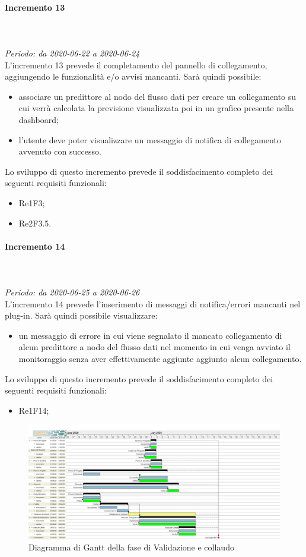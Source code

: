 \paragraph{Incremento 13}\mbox{} \\ \mbox{} \\ 
\textit{Periodo: da 2020-06-22 a 2020-06-24} \\
L'incremento 13 prevede il completamento del pannello di collegamento, aggiungendo le funzionalità e/o avvisi mancanti. Sarà quindi possibile: \begin{itemize}
\item associare un predittore al nodo del flusso dati per creare un collegamento su cui verrà calcolata la previsione visualizzata poi in un grafico presente nella dashboard;
\item l’utente deve poter visualizzare un messaggio di notifica di collegamento avvenuto con successo.
\end{itemize}
Lo sviluppo di questo incremento prevede il soddisfacimento completo dei seguenti requisiti funzionali: \begin{itemize}
\item Re1F3;
\item Re2F3.5.
\end{itemize}

\paragraph{Incremento 14}\mbox{} \\ \mbox{} \\ 
\textit{Periodo: da 2020-06-25 a 2020-06-26}\\
L'incremento 14 prevede l'inserimento di messaggi di notifica/errori mancanti nel plug-in. Sarà quindi possibile visualizzare: \begin{itemize}
\item un messaggio di errore in cui viene segnalato il mancato collegamento
di alcun predittore a nodo del flusso dati nel momento in cui venga
avviato il monitoraggio senza aver effettivamente aggiunte aggiunto
alcun collegamento.
\end{itemize}
Lo sviluppo di questo incremento prevede il soddisfacimento completo dei seguenti requisiti funzionali: \begin{itemize}
\item Re1F14;
\end{itemize}

\begin{figure}[H]
\centering
\includegraphics[scale=0.24]{./img/gantt/validazione_collaudo.png}
\caption{Diagramma di Gantt della fase di Validazione e collaudo}
\end{figure}